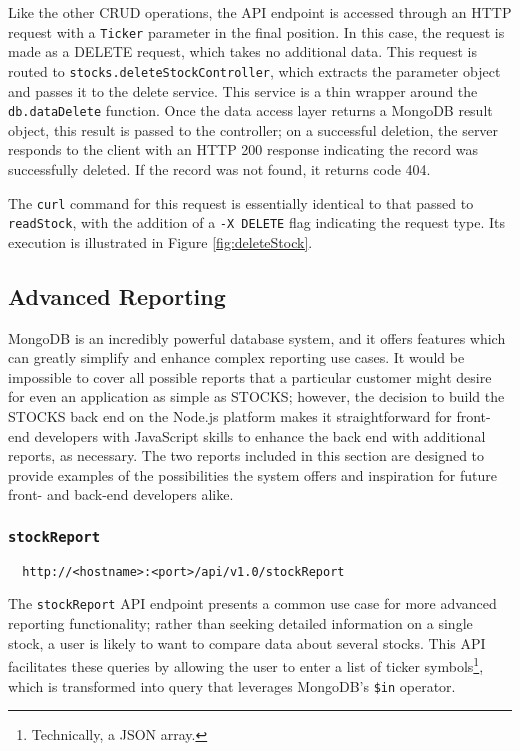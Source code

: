 \documentclass[
11pt,
titlepage,
]{article}
\begin{document}
Like the other CRUD operations, the API endpoint is accessed through an HTTP
request with a \texttt{Ticker} parameter in the final position. In this case,
the request is made as a DELETE request, which takes no additional data. This
request is routed to \texttt{stocks.deleteStockController}, which extracts the
parameter object and passes it to the delete service. This service is a thin
wrapper around the \texttt{db.dataDelete} function. Once the data access layer
returns a MongoDB result object, this result is passed to the controller; on a
successful deletion, the server responds to the client with an HTTP 200 response
indicating the record was successfully deleted. If the record was not found, it
returns code 404.

The \texttt{curl} command for this request is essentially identical to that
passed to \texttt{readStock}, with the addition of a \texttt{-X DELETE} flag
indicating the request type. Its execution is illustrated in Figure
\ref{fig:deleteStock}.

\subsection{Advanced Reporting}

MongoDB is an incredibly powerful database system, and it offers features which
can greatly simplify and enhance complex reporting use cases. It would be
impossible to cover all possible reports that a particular customer might desire
for even an application as simple as STOCKS; however, the decision to build the
STOCKS back end on the Node.js platform makes it straightforward for front-end
developers with JavaScript skills to enhance the back end with additional
reports, as necessary. The two reports included in this section are designed to
provide examples of the possibilities the system offers and inspiration for
future front- and back-end developers alike.

\subsubsection{\texttt{stockReport}}

\begin{lstlisting}
  http://<hostname>:<port>/api/v1.0/stockReport
\end{lstlisting}

The \texttt{stockReport} API endpoint presents a common use case for more
advanced reporting functionality; rather than seeking detailed information on a
single stock, a user is likely to want to compare data about several stocks.
This API facilitates these queries by allowing the user to enter a list of
ticker symbols\footnote{Technically, a JSON array.}, which is transformed into
query that leverages MongoDB's \texttt{\$in} operator.
\end{document}
